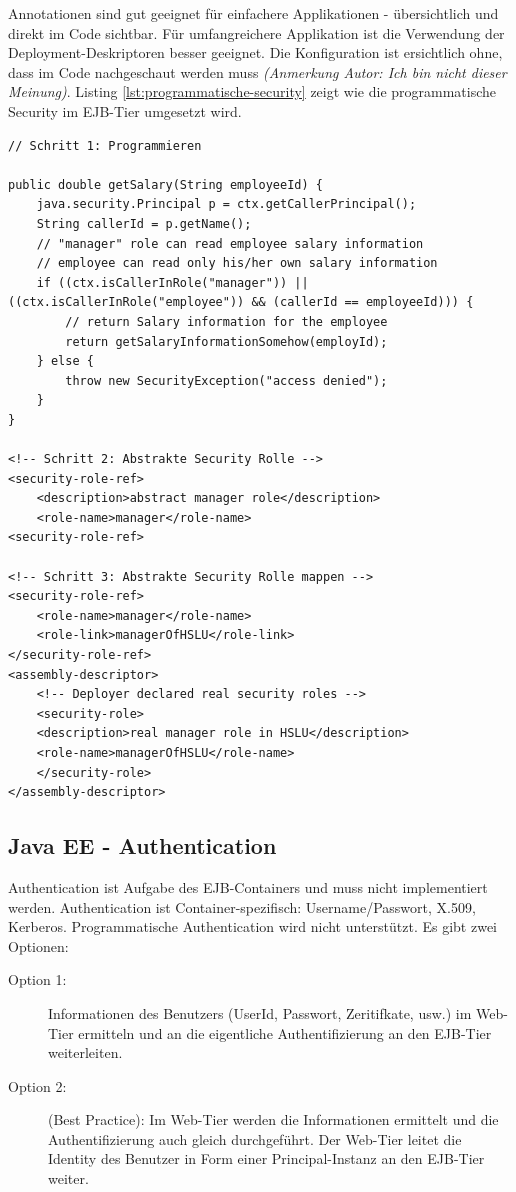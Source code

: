 Annotationen sind gut geeignet für einfachere Applikationen - übersichtlich und direkt im Code sichtbar. Für umfangreichere Applikation ist die Verwendung der Deployment-Deskriptoren besser geeignet. Die Konfiguration ist ersichtlich ohne, dass im Code nachgeschaut werden muss \emph{(Anmerkung Autor: Ich bin nicht dieser Meinung)}. Listing \ref{lst:programmatische-security} zeigt wie die programmatische Security im EJB-Tier umgesetzt wird.

\newpage

\begin{lstlisting}[caption=Programmatische Security im EJB-Tier, label=lst:programmatische-security]
// Schritt 1: Programmieren

public double getSalary(String employeeId) {
	java.security.Principal p = ctx.getCallerPrincipal();
	String callerId = p.getName();
	// "manager" role can read employee salary information
	// employee can read only his/her own salary information
	if ((ctx.isCallerInRole("manager")) || ((ctx.isCallerInRole("employee")) && (callerId == employeeId))) {
		// return Salary information for the employee
		return getSalaryInformationSomehow(employId);
	} else {
		throw new SecurityException("access denied");
	}
}

<!-- Schritt 2: Abstrakte Security Rolle -->
<security-role-ref>
	<description>abstract manager role</description>
	<role-name>manager</role-name>
<security-role-ref>

<!-- Schritt 3: Abstrakte Security Rolle mappen -->
<security-role-ref>
	<role-name>manager</role-name>
	<role-link>managerOfHSLU</role-link>
</security-role-ref>
<assembly-descriptor>
	<!-- Deployer declared real security roles -->
	<security-role>
	<description>real manager role in HSLU</description>
	<role-name>managerOfHSLU</role-name>
	</security-role>
</assembly-descriptor>
\end{lstlisting}

\subsection{Java EE - Authentication}
Authentication ist Aufgabe des EJB-Containers und muss nicht implementiert werden. Authentication ist Container-spezifisch: Username/Passwort, X.509, Kerberos. Programmatische Authentication wird nicht unterstützt. Es gibt zwei Optionen:

\begin{description}
	\item[Option 1:] Informationen des Benutzers (UserId, Passwort, Zeritifkate, usw.) im Web-Tier ermitteln und an die eigentliche Authentifizierung an den EJB-Tier weiterleiten. 
	\item[Option 2:] (Best Practice): Im Web-Tier werden die Informationen ermittelt und die Authentifizierung auch gleich durchgeführt. Der Web-Tier leitet die Identity des Benutzer in Form einer Principal-Instanz an den EJB-Tier weiter. 
\end{description}

